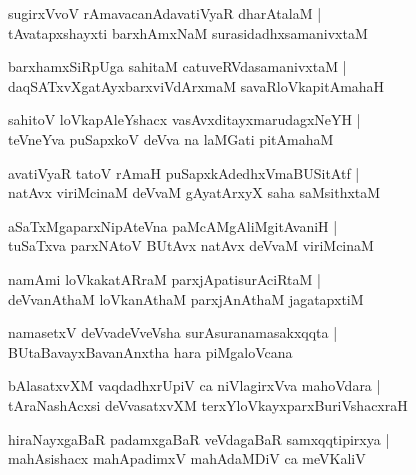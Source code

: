 \begin{shloka}
sugirxVvoV rAmavacanAdavatiVyaR dharAtalaM |\\
tAvatapxshayxti barxhAmxNaM surasidadhxsamanivxtaM 
\end{shloka}

\begin{shloka}
barxhamxSiRpUga sahitaM catuveRVdasamanivxtaM |\\
daqSATxvXgatAyxbarxviVdArxmaM savaRloVkapitAmahaH 
\end{shloka}

\begin{shloka}
sahitoV loVkapAleYshacx vasAvxditayxmarudagxNeYH |\\
teVneYva puSapxkoV deVva na laMGati pitAmahaM 
\end{shloka}

\begin{shloka}
avatiVyaR tatoV rAmaH puSapxkAdedhxVmaBUSitAtf |\\
natAvx viriMcinaM deVvaM gAyatArxyX saha saMsithxtaM 
\end{shloka}

\begin{shloka}
aSaTxMgaparxNipAteVna paMcAMgAliMgitAvaniH |\\
tuSaTxva parxNAtoV BUtAvx natAvx deVvaM viriMcinaM 
\end{shloka}

\begin{shloka}
namAmi loVkakatARraM parxjApatisurAciRtaM |\\
deVvanAthaM loVkanAthaM parxjAnAthaM jagatapxtiM 
\end{shloka}

\begin{shloka}
namasetxV deVvadeVveVsha surAsuranamasakxqqta |\\
BUtaBavayxBavanAnxtha hara piMgaloVcana 
\end{shloka}

\begin{shloka}
bAlasatxvXM vaqdadhxrUpiV ca niVlagirxVva mahoVdara |\\
tAraNashAcxsi deVvasatxvXM terxYloVkayxparxBuriVshacxraH 
\end{shloka}

\begin{shloka}
hiraNayxgaBaR padamxgaBaR veVdagaBaR samxqqtipirxya |\\
mahAsishacx mahApadimxV mahAdaMDiV ca meVKaliV 
\end{shloka}

